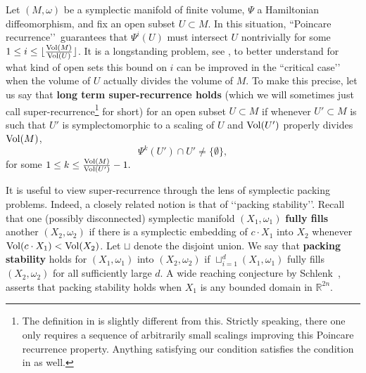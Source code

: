\documentclass[11pt, reqno]{amsart}
\theoremstyle{remark}
\numberwithin{equation}{subsection}
\numberwithin{figure}{section}
\theoremstyle{customremark}
\newcommand{\vol}{{\rm Vol}}
\begin{document}
Let $(M,\omega)$ be a symplectic manifold of finite volume, $\Psi$ a Hamiltonian diffeomorphism, and fix an open subset $U \subset M$.  In this situation, ``Poincare recurrence\rq\rq\, guarantees that $\Psi^i(U)$ must intersect $U$ nontrivially for some $1 \le i \le \lfloor \frac{ \vol(M)}{\vol(U)} \rfloor$.  It is a longstanding problem, see \cite{polterovichschlenk},
to better understand for what kind of open sets this bound on $i$ can be improved in the ``critical case\rq\rq\, when the volume of $U$ actually divides the volume of $M$.   To make this precise, 
let us say that {\bf long term super-recurrence holds} (which we will sometimes just call super-recurrence\footnote{The definition in \cite{polterovichschlenk} is slightly different from this.  Strictly speaking, there one only requires a sequence of arbitrarily small scalings improving this Poincare recurrence property.  Anything satisfying our condition satisfies the condition in \cite{polterovichschlenk} as well.} 
for short) for an open subset $U \subset M$ if whenever $U' \subset M$ is such that $U'$ is symplectomorphic to a scaling of $U$ and $\vol(U')$ properly divides $\vol(M)$, 
\[ \Psi^k(U') \cap U' \ne \lbrace \emptyset \rbrace,\]
for some $1 \le k \le \frac{\vol(M)}{\vol(U')} - 1.$





It is useful to view super-recurrence through the lens of symplectic packing problems.  Indeed, a closely related notion is that of \lq\lq packing stability\rq\rq.  Recall that one (possibly disconnected) symplectic manifold $(X_1,\omega_1)$ {\bf fully fills} another $(X_2,\omega_2)$  if there is a symplectic embedding of $c \cdot X_1$ into $X_2$ whenever  $\vol(c \cdot X_1) < \vol(X_2)$.  Let $\sqcup$ denote the disjoint union.  We say that {\bf packing stability} holds for $(X_1,\omega_1)$ into $(X_2,\omega_2)$ if $\sqcup^d_{i=1} (X_1,\omega_1)$ fully fills $(X_2,\omega_2)$ for all sufficiently large $d$.    A wide reaching conjecture by Schlenk~\cite{schl}, asserts that packing stability holds %
when $X_1$ is any bounded domain in $\mathbb{R}^{2n}.$
\end{document}
